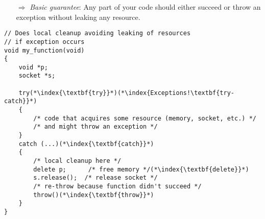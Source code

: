 \documentclass[10pt]{article}
\begin{document}
\begin{enumerate}
\item[$\Rightarrow$] \emph{Basic guarantee}: Any part of your code should either succeed or throw an exception without leaking any resource.
\end{enumerate}
\begin{lstlisting}
// Does local cleanup avoiding leaking of resources
// if exception occurs
void my_function(void)
{
    void *p;
    socket *s;
    
    try(*\index{\textbf{try}}*)(*\index{Exceptions!\textbf{try-catch}}*)
    {
        /* code that acquires some resource (memory, socket, etc.) */
        /* and might throw an exception */
    }
    catch (...)(*\index{\textbf{catch}}*)
    { 
        /* local cleanup here */
        delete p;      /* free memory */(*\index{\textbf{delete}}*)
        s.release();  /* release socket */  
        /* re-throw because function didn't succeed */
        throw()(*\index{\textbf{throw}}*)
    }    
}
\end{lstlisting}
%
%
\end{document}
